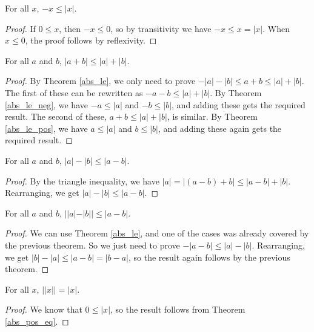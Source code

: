 \documentclass[../../math.tex]{subfiles}
\begin{document}
\begin{theorem} \label{abs_le_neg}
    For all $x$, $-x \leq |x|$.
\end{theorem}
\begin{proof}
    If $0 \leq x$, then $-x \leq 0$, so by transitivity we have $-x \leq x =
    |x|$.  When $x \leq 0$, the proof follows by reflexivity.
\end{proof}

\begin{theorem}
    For all $a$ and $b$, $|a + b| \leq |a| + |b|$.
\end{theorem}
\begin{proof}
    By Theorem \ref{abs_le}, we only need to prove $-|a| - |b| \leq a + b \leq
    |a| + |b|$.  The first of these can be rewritten as $-a - b \leq |a| + |b|$.
    By Theorem \ref{abs_le_neg}, we have $-a \leq |a|$ and $-b \leq |b|$, and
    adding these gets the required result.  The second of these, $a + b \leq |a|
    + |b|$, is similar.  By Theorem \ref{abs_le_pos}, we have $a \leq |a|$ and
    $b \leq |b|$, and adding these again gets the required result.
\end{proof}

\begin{theorem}
    For all $a$ and $b$, $|a| - |b| \leq |a - b|$.
\end{theorem}
\begin{proof}
    By the triangle inequality, we have $|a| = |(a - b) + b| \leq |a - b| +
    |b|$.  Rearranging, we get $|a| - |b| \leq |a - b|$.
\end{proof}

\begin{theorem}
    For all $a$ and $b$, $||a| - |b|| \leq |a - b|$.
\end{theorem}
\begin{proof}
    We can use Theorem \ref{abs_le}, and one of the cases was already covered by
    the previous theorem.  So we just need to prove $-|a - b| \leq |a| - |b|$.
    Rearranging, we get $|b| - |a| \leq |a - b| = |b - a|$, so the result again
    follows by the previous theorem.
\end{proof}

\begin{theorem}
    For all $x$, $||x|| = |x|$.
\end{theorem}
\begin{proof}
    We know that $0 \leq |x|$, so the result follows from Theorem
    \ref{abs_pos_eq}.
\end{proof}
\end{document}
